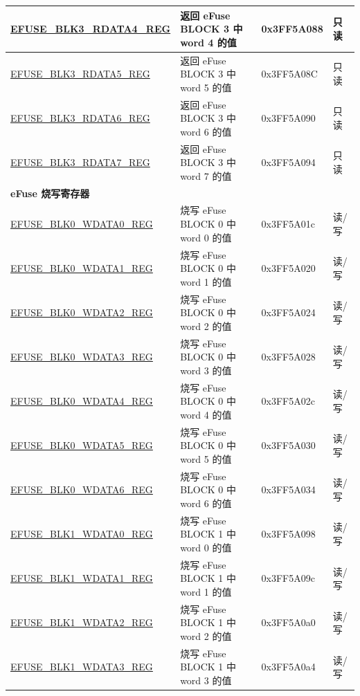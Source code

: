 \begin{longtable}{ | p{5cm} | p{7.5cm} | p{2cm} | p{1cm} | }
    \hyperref[regdesc:EFUSEBLK3RDATAnREG]{EFUSE\_BLK3\_RDATA4\_REG} & 返回 eFuse BLOCK 3 中 word 4 的值& 0x3FF5A088 & 只读 \\ \hline
    \hyperref[regdesc:EFUSEBLK3RDATAnREG]{EFUSE\_BLK3\_RDATA5\_REG} & 返回 eFuse BLOCK 3 中 word 5 的值& 0x3FF5A08C & 只读 \\ \hline
    \hyperref[regdesc:EFUSEBLK3RDATAnREG]{EFUSE\_BLK3\_RDATA6\_REG} & 返回 eFuse BLOCK 3 中 word 6 的值& 0x3FF5A090 & 只读 \\ \hline
    \hyperref[regdesc:EFUSEBLK3RDATAnREG]{EFUSE\_BLK3\_RDATA7\_REG} & 返回 eFuse BLOCK 3 中 word 7 的值& 0x3FF5A094 & 只读 \\ \hline
    \multicolumn{4}{|l|}{\textbf{eFuse 烧写寄存器}} \\ \hline
    \hyperref[regdesc:EFUSEBLK0WDATA0REG]{EFUSE\_BLK0\_WDATA0\_REG} & 烧写 eFuse BLOCK 0 中 word 0 的值 & 0x3FF5A01c & 读/写 \\\hline
    \hyperref[regdesc:EFUSEBLK0WDATA1REG]{EFUSE\_BLK0\_WDATA1\_REG} & 烧写 eFuse BLOCK 0 中 word 1 的值 & 0x3FF5A020 & 读/写 \\ \hline
    \hyperref[regdesc:EFUSEBLK0WDATA2REG]{EFUSE\_BLK0\_WDATA2\_REG} & 烧写 eFuse BLOCK 0 中 word 2 的值 & 0x3FF5A024 & 读/写 \\ \hline
    \hyperref[regdesc:EFUSEBLK0WDATA3REG]{EFUSE\_BLK0\_WDATA3\_REG} & 烧写 eFuse BLOCK 0 中 word 3 的值 & 0x3FF5A028 &  读/写 \\ \hline
    \hyperref[regdesc:EFUSEBLK0WDATA4REG]{EFUSE\_BLK0\_WDATA4\_REG} & 烧写 eFuse BLOCK 0 中 word 4 的值 & 0x3FF5A02c & 读/写 \\ \hline
    \hyperref[regdesc:EFUSEBLK0WDATA5REG]{EFUSE\_BLK0\_WDATA5\_REG} & 烧写 eFuse BLOCK 0 中 word 5 的值 & 0x3FF5A030 & 读/写 \\ \hline
    \hyperref[regdesc:EFUSEBLK0WDATA6REG]{EFUSE\_BLK0\_WDATA6\_REG} & 烧写 eFuse BLOCK 0 中 word 6 的值 & 0x3FF5A034 & 读/写 \\ \hline
    \hyperref[regdesc:EFUSEBLK1WDATAnREG]{EFUSE\_BLK1\_WDATA0\_REG} & 烧写 eFuse BLOCK 1 中 word 0 的值 & 0x3FF5A098 & 读/写 \\ \hline
    \hyperref[regdesc:EFUSEBLK1WDATAnREG]{EFUSE\_BLK1\_WDATA1\_REG} & 烧写 eFuse BLOCK 1 中 word 1 的值 & 0x3FF5A09c & 读/写 \\ \hline
    \hyperref[regdesc:EFUSEBLK1WDATAnREG]{EFUSE\_BLK1\_WDATA2\_REG} & 烧写 eFuse BLOCK 1 中 word 2 的值 & 0x3FF5A0a0 & 读/写 \\ \hline
    \hyperref[regdesc:EFUSEBLK1WDATAnREG]{EFUSE\_BLK1\_WDATA3\_REG} & 烧写 eFuse BLOCK 1 中 word 3 的值 & 0x3FF5A0a4 & 读/写 \\ \hline

\end{longtable}
